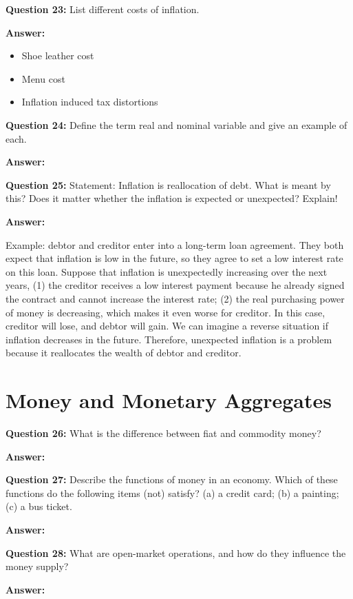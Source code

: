 \documentclass[a4paper, 11pt]{article}
\begin{document}
\textbf{Question 23:} List different costs of inflation.

\textbf{Answer:} 
\begin{itemize}
\item Shoe leather cost
\item Menu cost
\item Inflation induced tax distortions
\end{itemize}

\textbf{Question 24:} Define the term real and nominal variable and give an example of each.

\textbf{Answer:} 


\textbf{Question 25:} Statement: Inflation is reallocation of debt. What is meant by this? Does it matter whether the inflation is expected or unexpected? Explain!

\textbf{Answer:} 

Example: debtor and creditor enter into a long-term loan agreement. They both expect that inflation is low in the future, so they agree to set a low interest rate on this loan. Suppose that inflation is unexpectedly increasing over the next years, (1) the creditor receives a low interest payment because he already signed the contract and cannot increase the interest rate; (2) the real purchasing power of money is decreasing, which makes it even worse for creditor. In this case, creditor will lose, and debtor will gain. We can imagine a reverse situation if inflation decreases in the future. Therefore, unexpected inflation is a problem because it reallocates the wealth of debtor and creditor. \\

\section{Money and Monetary Aggregates}

\textbf{Question 26:} What is the difference between fiat and commodity money?

\textbf{Answer:} 

\textbf{Question 27:} Describe the functions of money in an economy. Which of these functions do the following items (not) satisfy? (a) a credit card; (b) a painting; (c) a bus ticket.

\textbf{Answer:} 

\textbf{Question 28:} What are open-market operations, and how do they influence the money supply?

\textbf{Answer:} 
\end{document}

